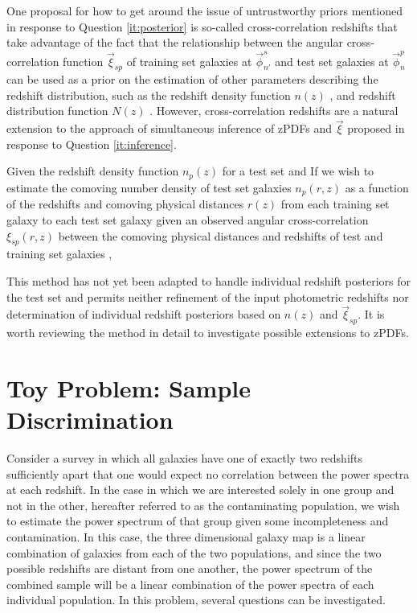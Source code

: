 \documentclass[12pt, onecolumn]{emulateapj}
\begin{document}
One proposal for how to get around the issue of untrustworthy priors mentioned in response to Question \ref{it:posterior} is so-called cross-correlation redshifts that take advantage of the fact that the relationship between the angular cross-correlation function $\vec{\xi}_{sp}$ of training set galaxies at $\vec{\phi}^{s}_{n'}$ and test set galaxies at $\vec{\phi}^{p}_{n}$ can be used as a prior on the estimation of other parameters describing the redshift distribution, such as the redshift density function $n(z)$ \citep{new08}, \citep{men13} and redshift distribution function $N(z)$ \citep{mat10}.  However, cross-correlation redshifts are a natural extension to the approach of simultaneous inference of zPDFs and $\vec{\xi}$ proposed in response to Question \ref{it:inference}.

Given the redshift density function $n_{p}(z)$ for a test set and If we wish to estimate the comoving number density of test set galaxies $n_{p}(r,z)$ as a function of the redshifts and comoving physical distances $r(z)$ from each training set galaxy to each test set galaxy given an observed angular cross-correlation $\xi_{sp}(r,z)$ between the comoving physical distances and redshifts of test and training set galaxies ,  \citep{new08}

This method has not yet been adapted to handle individual redshift posteriors for the test set and permits neither refinement of the input photometric redshifts nor determination of individual redshift posteriors based on $n(z)$ and $\vec{\xi}_{sp}$.  It is worth reviewing the method in detail to investigate possible extensions to zPDFs.

\section{Toy Problem: Sample Discrimination}

Consider a survey in which all galaxies have one of exactly two redshifts sufficiently apart that one would expect no correlation between the power spectra at each redshift.  In the case in which we are interested solely in one group and not in the other, hereafter referred to as the contaminating population, we wish to estimate the power spectrum of that group given some incompleteness and contamination.  In this case, the three dimensional galaxy map is a linear combination of galaxies from each of the two populations, and since the two possible redshifts are distant from one another, the power spectrum of the combined sample will be a linear combination of the power spectra of each individual population.  In this problem, several questions can be investigated.
\end{document}
